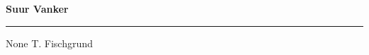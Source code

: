 \documentclass[10pt]{book}
\begin{document}
{
  \samepage
  \raggedbottom
  \raggedright
  \sloppy


  \vspace{0.2in}

  \noindent\begin{minipage}{.1\textwidth}
    \hfill\vspace{0.1in}
  \end{minipage}%
  \noindent\begin{minipage}{.8\textwidth}
    \centering
    \bfseries
    \large Suur Vanker
  \end{minipage}%
  \noindent\begin{minipage}{.1\textwidth}
      \hfill\vspace{0.1in}
  \end{minipage}

  \nopagebreak[4]
  \vspace{0.1in}
  \nopagebreak[4]
  \hrule height 0.05ex
  \nopagebreak[4]
  \vspace{-0.05in}

  {\footnotesize None \hfill T. Fischgrund }\\
  \vspace{0.01in}



}
\end{document}
